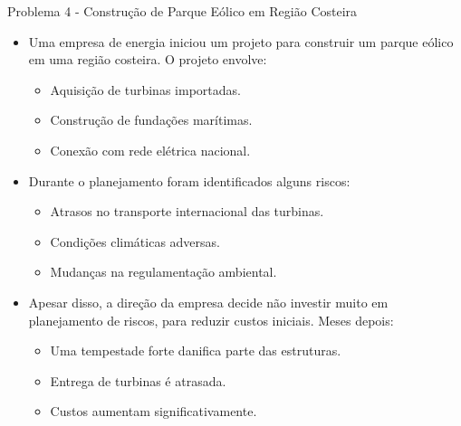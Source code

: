 \documentclass{beamer}
\begin{document}
\begin{frame}{Problema 4 - Construção de Parque Eólico em Região Costeira}
	\begin{itemize}
		\justifying
		\item Uma empresa de energia iniciou um projeto para construir um parque eólico em uma região costeira. O projeto envolve:
			\begin{itemize}
				\justifying
				\item Aquisição de turbinas importadas.
				\item Construção de fundações marítimas.
				\item Conexão com rede elétrica nacional.
			\end{itemize}
		\item Durante o planejamento foram identificados alguns riscos:
			\begin{itemize}
				\justifying
				\item Atrasos no transporte internacional das turbinas.
				\item Condições climáticas adversas.
				\item Mudanças na regulamentação ambiental.
			\end{itemize}
		\item Apesar disso, a direção da empresa decide não investir muito em planejamento de riscos, para reduzir custos iniciais. Meses depois:
			\begin{itemize}
				\justifying
				\item Uma tempestade forte danifica parte das estruturas.
				\item Entrega de turbinas é atrasada.
				\item Custos aumentam significativamente.
			\end{itemize}
	\end{itemize}
\end{frame}
\end{document}
